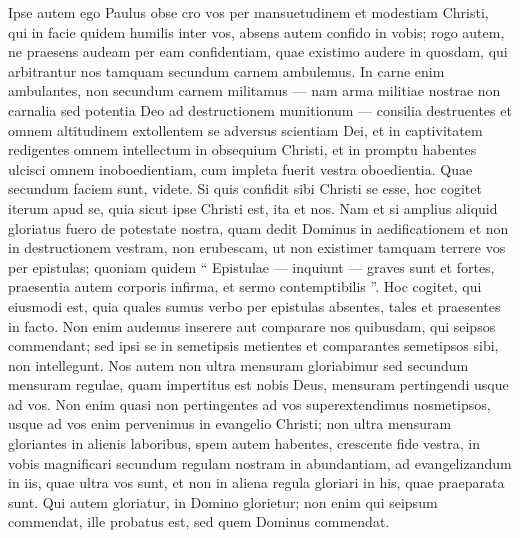 \begin{biblechapter}
\begin{biblechapter}
\begin{biblechapter}
\begin{biblechapter}
\begin{biblechapter}
\begin{biblechapter}
\begin{biblechapter}
\begin{biblechapter}
\begin{biblechapter}
\begin{biblechapter}
\verse Ipse autem ego Paulus obse cro vos per mansuetudinem et modestiam Christi, qui in facie quidem humilis inter vos, absens autem confido in vobis; 
 \verse rogo autem, ne praesens audeam per eam confidentiam, quae existimo audere in quosdam, qui arbitrantur nos tamquam secundum carnem ambulemus. 
\verse In carne enim ambulantes, non secundum carnem militamus 
\verse — nam arma militiae nostrae non carnalia sed potentia Deo ad destructionem munitionum — consilia destruentes 
 \verse et omnem altitudinem extollentem se adversus scientiam Dei, et in captivitatem redigentes omnem intellectum in obsequium Christi, 
\verse et in promptu habentes ulcisci omnem inoboedientiam, cum impleta fuerit vestra oboedientia.
 \verse Quae secundum faciem sunt, videte. Si quis confidit sibi Christi se esse, hoc cogitet iterum apud se, quia sicut ipse Christi est, ita et nos. 
\verse Nam et si amplius aliquid gloriatus fuero de potestate nostra, quam dedit Dominus in aedificationem et non in destructionem vestram, non erubescam, 
\verse ut non existimer tamquam terrere vos per epistulas; 
\verse quoniam quidem “ Epistulae — inquiunt — graves sunt et fortes, praesentia autem corporis infirma, et sermo contemptibilis ”. 
\verse Hoc cogitet, qui eiusmodi est, quia quales sumus verbo per epistulas absentes, tales et praesentes in facto.
 \verse Non enim audemus inserere aut comparare nos quibusdam, qui seipsos commendant; sed ipsi se in semetipsis metientes et comparantes semetipsos sibi, non intellegunt. 
\verse Nos autem non ultra mensuram gloriabimur sed secundum mensuram regulae, quam impertitus est nobis Deus, mensuram pertingendi usque ad vos. 
\verse Non enim quasi non pertingentes ad vos superextendimus nosmetipsos, usque ad vos enim pervenimus in evangelio Christi; 
\verse non ultra mensuram gloriantes in alienis laboribus, spem autem habentes, crescente fide vestra, in vobis magnificari secundum regulam nostram in abundantiam, 
\verse ad evangelizandum in iis, quae ultra vos sunt, et non in aliena regula gloriari in his, quae praeparata sunt.
 \verse Qui autem gloriatur, in Domino glorietur; 
\verse non enim qui seipsum commendat, ille probatus est, sed quem Dominus commendat.
 

\end{biblechapter}
\end{biblechapter}
\end{biblechapter}
\end{biblechapter}
\end{biblechapter}
\end{biblechapter}
\end{biblechapter}
\end{biblechapter}
\end{biblechapter}
\end{biblechapter}
